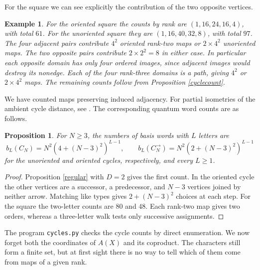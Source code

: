 \documentclass[11pt,a4paper]{article}
\newtheorem{prop}[thm]{Proposition}
\newtheorem{ex}[thm]{Example}
\begin{document}
For the square we can see explicitly the contribution of the two opposite vertices.

\begin{samepage}
\begin{ex}
For the oriented square the counts by rank are $(1,16,24,16,4)$, with total $61$. For the unoriented square they are $(1,16,40,32,8)$, with total $97$. The four adjacent pairs contribute $4^2$ oriented rank-two maps or $2\times4^2$ unoriented maps. The two opposite pairs contribute $2\times2^2=8$ in either case. In particular each opposite domain has only four ordered images, since adjacent images would destroy its nonedge. Each of the four rank-three domains is a path, giving $4^2$ or $2\times4^2$ maps. The remaining counts follow from Proposition \ref{cyclecount}.
\end{ex}
\end{samepage}

We have counted maps preserving induced adjacency. For partial isometries of the ambient cycle distance, see \cite{fp}. The corresponding quantum word counts are as follows.

\begin{prop}
For $N\geq3$, the numbers of basis words with $L$ letters are
\[
 b_L(C_N)=N^2(4+(N-3)^2)^{L-1},\qquad
 b_L(C_N^{\to})=N^2(2+(N-3)^2)^{L-1}
\]
for the unoriented and oriented cycles, respectively, and every $L\geq1$.
\end{prop}
\begin{proof}
Proposition \ref{regular} with $D=2$ gives the first count. In the oriented cycle the other vertices are a successor, a predecessor, and $N-3$ vertices joined by neither arrow. Matching like types gives $2+(N-3)^2$ choices at each step. For the square the two-letter counts are $80$ and $48$. Each rank-two map gives two orders, whereas a three-letter walk tests only successive assignments.
\end{proof}

The program \texttt{cycles.py} checks the cycle counts by direct enumeration. We now forget both the coordinates of $A(X)$ and its coproduct. The characters still form a finite set, but at first sight there is no way to tell which of them come from maps of a given rank.
\end{document}
